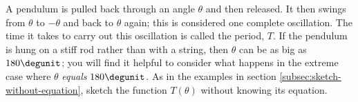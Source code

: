 A pendulum is pulled back through an angle $\theta$ and then released.
It then swings from $\theta$ to $-\theta$ and back to $\theta$ again;
this is considered one complete oscillation.
The time it takes to carry out this oscillation is called the period,
$T$. If the pendulum is hung on a stiff rod rather than with a string,
then $\theta$ can be as big as $180\degunit$; you will find it helpful
to consider what happens in the extreme case where $\theta$ \emph{equals}
$180\degunit$.
As in the examples
in section \ref{subsec:sketch-without-equation}, sketch the function
$T(\theta)$ without knowing its equation.
